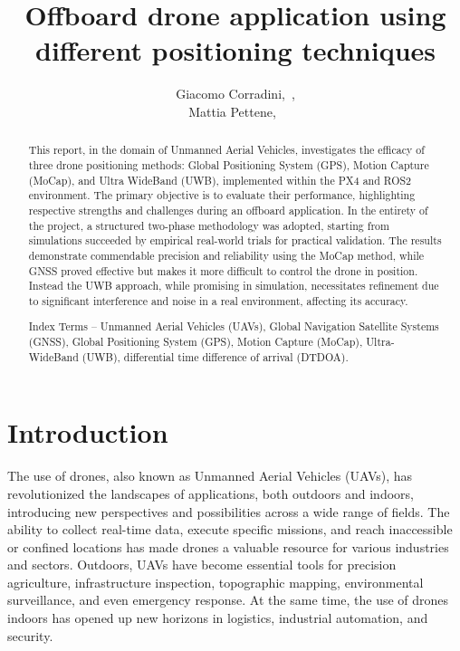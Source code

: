 \documentclass[journal]{IEEEtran}
\begin{document}
\title{Offboard drone application using different positioning techniques}

\author{Giacomo Corradini,~,  \\
Mattia Pettene,~
        }%

\maketitle

\begin{abstract}
This report, in the domain of Unmanned Aerial Vehicles, investigates the efficacy of three drone positioning methods: Global Positioning System (GPS), Motion Capture (MoCap), and Ultra WideBand (UWB), implemented within the PX4 and ROS2 environment. The primary objective is to evaluate their performance, highlighting respective strengths and challenges during an offboard application. In the entirety of the project, a structured two-phase methodology was adopted, starting from simulations succeeded by empirical real-world trials for practical validation. The results demonstrate commendable precision and reliability using the MoCap method, while GNSS proved effective but makes it more difficult to control the drone in position. Instead the UWB approach, while promising in simulation, necessitates refinement due to significant interference and noise in a real environment, affecting its accuracy. 
\vspace{3mm}

Index Terms -- Unmanned Aerial Vehicles (UAVs), Global Navigation Satellite Systems (GNSS), Global Positioning System (GPS), Motion Capture (MoCap), Ultra-WideBand (UWB), differential time difference of arrival (DTDOA). 

\end{abstract}

\IEEEpeerreviewmaketitle

\section{Introduction}

The use of drones, also known as Unmanned Aerial Vehicles (UAVs), has revolutionized the landscapes of applications, both outdoors and indoors, introducing new perspectives and possibilities across a wide range of fields. The ability to collect real-time data, execute specific missions, and reach inaccessible or confined locations has made drones a valuable resource for various industries and sectors. Outdoors, UAVs have become essential tools for precision agriculture, infrastructure inspection, topographic mapping, environmental surveillance, and even emergency response. At the same time, the use of drones indoors has opened up new horizons in logistics, industrial automation, and security. 
\end{document}
